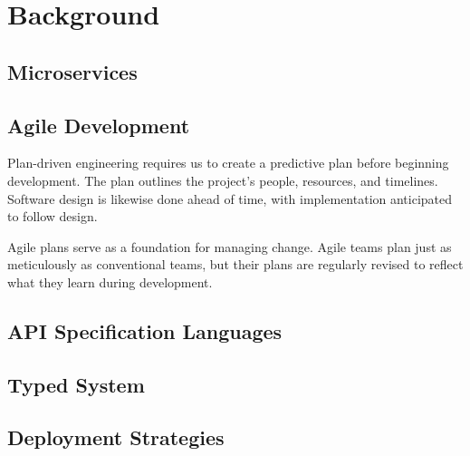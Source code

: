 
%

\chapter{Background}
\label{cha:background}

\section{Microservices} %
\label{sec:microservices}


\section{Agile Development} %
\label{sec:agile_development}

Plan-driven engineering requires us to create a predictive plan before beginning development.
The plan outlines the project's people, resources, and timelines.
Software design is likewise done ahead of time, with implementation anticipated to follow design.

Agile plans serve as a foundation for managing change.
Agile teams plan just as meticulously as conventional teams, but their plans are regularly revised to reflect what they learn during development.

\section{API Specification Languages} %
\label{sec:api_specification_languages}

\section{Typed System} %
\label{sec:typed_languages}

\section{Deployment Strategies} %
\label{sec:deployment_strategies}
